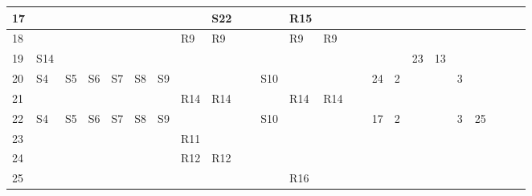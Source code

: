 \begin{table}
\begin{tabular}{ |l|l|l|l|l|l|l|l|l|l|l|l|l|l|l|l|l|l|l|l|l|l|l| }
17 &   &   &   &   &   &   &   & S22 &   &   & R15 &   &   &   &   &   &   &   &  \\ \hline 
18 &   &   &   &   &   &   & R9 & R9 &   &   & R9 & R9 &   &   &   &   &   &   &  \\ \hline 
19 & S14 &   &   &   &   &   &   &   &   &   &   &   &   &   &   & 23 & 13 &   &  \\ \hline 
20 & S4 & S5 & S6 & S7 & S8 & S9 &   &   &   & S10 &   &   &   & 24 & 2 &   &   & 3 &  \\ \hline 
21 &   &   &   &   &   &   & R14 & R14 &   &   & R14 & R14 &   &   &   &   &   &   &  \\ \hline 
22 & S4 & S5 & S6 & S7 & S8 & S9 &   &   &   & S10 &   &   &   & 17 & 2 &   &   & 3 & 25\\ \hline 
23 &   &   &   &   &   &   & R11 &   &   &   &   &   &   &   &   &   &   &   &  \\ \hline 
24 &   &   &   &   &   &   & R12 & R12 &   &   &   &   &   &   &   &   &   &   &  \\ \hline 
25 &   &   &   &   &   &   &   &   &   &   & R16 &   &   &   &   &   &   &   &  \\ \hline 

				\end{tabular}
			\end{table}
		